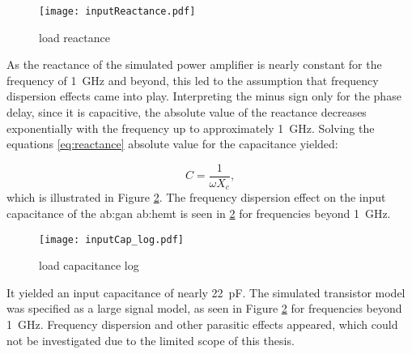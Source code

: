 \begin{figure}[ht]
	\centering
  \texttt{[image: inputReactance.pdf]}
	\caption{load reactance}
	\label{fig:inputReactance}
\end{figure}

As the reactance of the simulated power amplifier is nearly constant for the frequency of \SI{1}{\giga \hertz} and beyond, this led to the assumption that frequency dispersion effects came into play.
Interpreting the minus sign only for the phase delay, since it is capacitive, the absolute value of the reactance decreases exponentially with the frequency up to approximately \SI{1}{\giga \hertz}.
Solving the equations \ref{eq:reactance} absolute value for the capacitance yielded:

\begin{equation}
	C = \frac{1}{\omega X_c},
\end{equation}
which is illustrated in Figure \ref{fig:inputCap_log}.
The frequency dispersion effect on the input capacitance of the \gls{ab:gan} \gls{ab:hemt} is seen in \ref{fig:inputCap_log} for frequencies beyond \SI{1}{\giga \hertz}.

\begin{figure}[ht]
	\centering
  \texttt{[image: inputCap\_log.pdf]}
	\caption{load capacitance log}
	\label{fig:inputCap_log}
\end{figure}

It yielded an input capacitance of nearly \SI{22}{\pico \farad}.
The simulated transistor model was specified as a large signal model, as seen in Figure \ref{fig:inputCap_log} for frequencies beyond \SI{1}{\giga \hertz}.
Frequency dispersion and other parasitic effects appeared, which could not be investigated due to the limited scope of this thesis.

%
%
%


